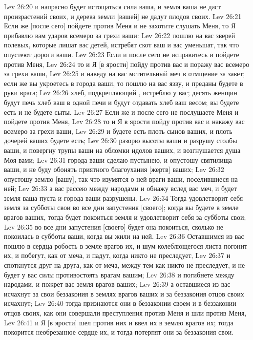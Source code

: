 \vs Lev 26:20 и напрасно будет истощаться сила ваша, и земля ваша не даст произрастений своих, и дерева земли [вашей] не дадут плодов своих.
\vs Lev 26:21 Если же [после сего] пойдете против Меня и не захотите слушать Меня, то Я прибавлю вам ударов всемеро за грехи ваши:
\vs Lev 26:22 пошлю на вас зверей полевых, которые лишат вас детей, истребят скот ваш и вас уменьшат, так что опустеют дороги ваши.
\vs Lev 26:23 Если и после сего не исправитесь и пойдете против Меня,
\vs Lev 26:24 то и Я [в ярости] пойду против вас и поражу вас всемеро за грехи ваши,
\vs Lev 26:25 и наведу на вас мстительный меч в отмщение за завет; если же вы укроетесь в города ваши, то пошлю на вас язву, и преданы будете в руки врага;
\vs Lev 26:26 хлеб, подкрепляющий , истреблю у вас; десять женщин будут печь хлеб ваш в одной печи и будут отдавать хлеб ваш весом; вы будете есть и не будете сыты.
\vs Lev 26:27 Если же и после сего не послушаете Меня и пойдете против Меня,
\vs Lev 26:28 то и Я в ярости пойду против вас и накажу вас всемеро за грехи ваши,
\vs Lev 26:29 и будете есть плоть сынов ваших, и плоть дочерей ваших будете есть;
\vs Lev 26:30 разорю высоты ваши и разрушу столбы ваши, и повергну трупы ваши на обломки идолов ваших, и возгнушается душа Моя вами;
\vs Lev 26:31 города ваши сделаю пустынею, и опустошу святилища ваши, и не буду обонять приятного благоухания [жертв] ваших;
\vs Lev 26:32 опустошу землю [вашу], так что изумятся о ней враги ваши, поселившиеся на ней;
\vs Lev 26:33 а вас рассею между народами и обнажу вслед вас меч, и будет земля ваша пуста и города ваши разрушены.
\vs Lev 26:34 Тогда удовлетворит себя земля за субботы свои во все дни запустения [своего]; когда вы будете в земле врагов ваших, тогда будет покоиться земля и удовлетворит себя за субботы свои;
\vs Lev 26:35 во все дни запустения [своего] будет она покоиться, сколько не покоилась в субботы ваши, когда вы жили на ней.
\vs Lev 26:36 Оставшимся из вас пошлю в сердца робость в земле врагов их, и шум колеблющегося листа погонит их, и побегут, как от меча, и падут, когда никто не преследует,
\vs Lev 26:37 и споткнутся друг на друга, как от меча, между тем как никто не преследует, и не будет у вас силы противостоять врагам вашим;
\vs Lev 26:38 и погибнете между народами, и пожрет вас земля врагов ваших;
\vs Lev 26:39 а оставшиеся из вас исчахнут за свои беззакония в землях врагов ваших и за беззакония отцов своих исчахнут;
\vs Lev 26:40 тогда признаются они в беззаконии своем и в беззаконии отцов своих, как они совершали преступления против Меня и шли против Меня,
\vs Lev 26:41  и Я [в ярости] шел против них и ввел их в землю врагов их; тогда покорится необрезанное сердце их, и тогда потерпят они за беззакония свои.
